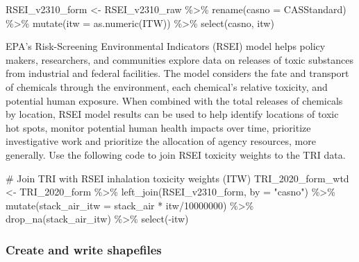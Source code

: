 \documentclass[
  letterpaper,
  DIV=11,
  numbers=noendperiod]{scrartcl}
\newenvironment{Shaded}{\begin{snugshade}}{\end{snugshade}}
\newcommand{\AttributeTok}[1]{\textcolor[rgb]{0.40,0.45,0.13}{#1}}
\newcommand{\CommentTok}[1]{\textcolor[rgb]{0.37,0.37,0.37}{#1}}
\newcommand{\DecValTok}[1]{\textcolor[rgb]{0.68,0.00,0.00}{#1}}
\newcommand{\FunctionTok}[1]{\textcolor[rgb]{0.28,0.35,0.67}{#1}}
\newcommand{\NormalTok}[1]{\textcolor[rgb]{0.00,0.23,0.31}{#1}}
\newcommand{\OtherTok}[1]{\textcolor[rgb]{0.00,0.23,0.31}{#1}}
\newcommand{\SpecialCharTok}[1]{\textcolor[rgb]{0.37,0.37,0.37}{#1}}
\newcommand{\StringTok}[1]{\textcolor[rgb]{0.13,0.47,0.30}{#1}}
\begin{document}
\begin{Shaded}
\begin{Highlighting}[]
\NormalTok{RSEI\_v2310\_form }\OtherTok{\textless{}{-}}\NormalTok{ RSEI\_v2310\_raw }\SpecialCharTok{\%\textgreater{}\%}
  \FunctionTok{rename}\NormalTok{(}\AttributeTok{casno =}\NormalTok{ CASStandard) }\SpecialCharTok{\%\textgreater{}\%}
  \FunctionTok{mutate}\NormalTok{(}\AttributeTok{itw =} \FunctionTok{as.numeric}\NormalTok{(ITW)) }\SpecialCharTok{\%\textgreater{}\%}
  \FunctionTok{select}\NormalTok{(casno, }
\NormalTok{         itw)}
\end{Highlighting}
\end{Shaded}

EPA's Risk-Screening Environmental Indicators (RSEI) model helps policy
makers, researchers, and communities explore data on releases of toxic
substances from industrial and federal facilities. The model considers
the fate and transport of chemicals through the environment, each
chemical's relative toxicity, and potential human exposure. When
combined with the total releases of chemicals by location, RSEI model
results can be used to help identify locations of toxic hot spots,
monitor potential human health impacts over time, prioritize
investigative work and prioritize the allocation of agency resources,
more generally. Use the following code to join RSEI toxicity weights to
the TRI data.

\begin{Shaded}
\begin{Highlighting}[]
\CommentTok{\# Join TRI with RSEI inhalation toxicity weights (ITW)}
\NormalTok{TRI\_2020\_form\_wtd }\OtherTok{\textless{}{-}}\NormalTok{ TRI\_2020\_form }\SpecialCharTok{\%\textgreater{}\%} 
  \FunctionTok{left\_join}\NormalTok{(RSEI\_v2310\_form, }\AttributeTok{by =} \StringTok{"casno"}\NormalTok{) }\SpecialCharTok{\%\textgreater{}\%}
  \FunctionTok{mutate}\NormalTok{(}\AttributeTok{stack\_air\_itw =}\NormalTok{ stack\_air }\SpecialCharTok{*}\NormalTok{ itw}\SpecialCharTok{/}\DecValTok{10000000}\NormalTok{) }\SpecialCharTok{\%\textgreater{}\%}
  \FunctionTok{drop\_na}\NormalTok{(stack\_air\_itw) }\SpecialCharTok{\%\textgreater{}\%}
  \FunctionTok{select}\NormalTok{(}\SpecialCharTok{{-}}\NormalTok{itw)}
\end{Highlighting}
\end{Shaded}

\hypertarget{create-and-write-shapefiles}{%
\subsubsection{Create and write
shapefiles}\label{create-and-write-shapefiles}}
\end{document}
